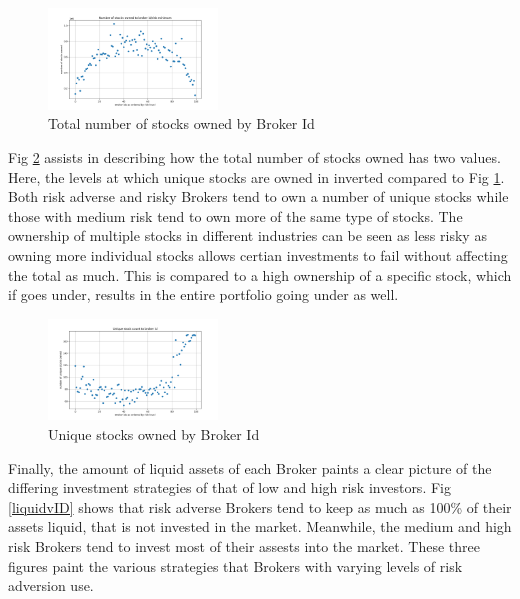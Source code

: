 \documentclass[letterpaper, 10 pt, proceedings]{ieeetran}
\begin{document}
	\begin{figure}[h]
		\centering
		\twocolumn
		\includegraphics[width=0.4\textwidth]{stocksOwnedToBrokerIds.png}
		\caption{Total number of stocks owned by Broker Id}
		\label{totalvID}
	\end{figure}
	\FloatBarrier

	Fig \ref{uniquevID} assists in describing how the total number of stocks owned has two values. Here, the levels at which unique stocks are owned in inverted compared to Fig \ref{totalvID}. Both risk adverse and risky Brokers tend to own a number of unique stocks while those with medium risk tend to own more of the same type of stocks. The ownership of multiple stocks in different industries can be seen as less risky as owning more individual stocks allows certian investments to fail without affecting the total as much. This is compared to a high ownership of a specific stock, which if goes under, results in the entire portfolio going under as well.  

	\begin{figure}[h]
		\centering
		\includegraphics[width=0.4\textwidth]{uniqueStockCountToBrokerIds.png}
		\caption{Unique stocks owned by Broker Id}
		\label{uniquevID}
	\end{figure}
	\FloatBarrier

	Finally, the amount of liquid assets of each Broker paints a clear picture of the differing investment strategies of that of low and high risk investors. Fig \ref{liquidvID} shows that risk adverse Brokers tend to keep as much as 100\% of their assets liquid, that is not invested in the market. Meanwhile, the medium and high risk Brokers tend to invest most of their assests into the market. These three figures paint the various strategies that Brokers with varying levels of risk adversion use.
\end{document}
